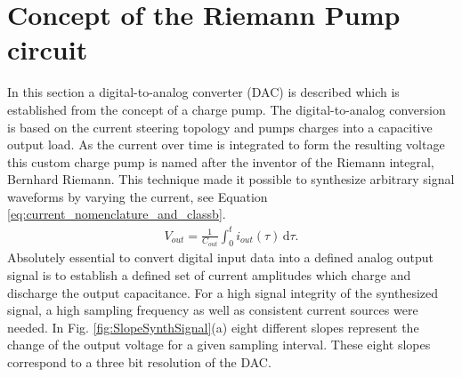 \documentclass[journal]{IEEEtran}
\begin{document}
\section{Concept of the Riemann Pump circuit}
\label{sec:theory}
%
In this section a digital-to-analog converter (DAC) is described which is established from the concept of a charge pump.
The digital-to-analog conversion is based on the current steering topology and pumps charges into a capacitive output load.
As the current over time is integrated to form the resulting voltage this custom charge pump is named after the inventor of the Riemann integral, Bernhard Riemann.
%
This technique made it possible to synthesize arbitrary signal waveforms by varying the current, see Equation \ref{eq:current_nomenclature_and_classb}.
%
\begin{align}
  V_{out} =  \frac{1}{C_{out}} \int_0^t \! i_{out}(\tau) \, \mathrm{d}\tau.
    \label{eq:current_nomenclature_and_classb}
\end{align}
%
Absolutely essential to convert digital input data into a defined analog output signal is to establish a defined set of current amplitudes which charge and discharge the output capacitance.
For a high signal integrity of the synthesized signal, a high sampling frequency as well as consistent current sources were needed.
In Fig. \ref{fig:SlopeSynthSignal}(a) eight different slopes represent the change of the output voltage for a given sampling interval.
These eight slopes correspond to a three bit resolution of the DAC. 
\end{document}
